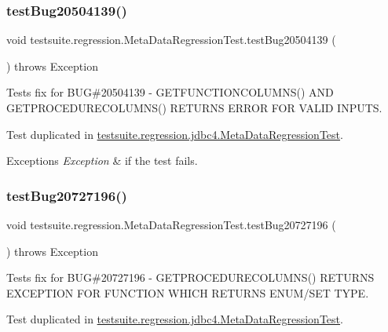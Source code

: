\subsubsection{\texorpdfstring{test\+Bug20504139()}{testBug20504139()}}
{\footnotesize\ttfamily void testsuite.\+regression.\+Meta\+Data\+Regression\+Test.\+test\+Bug20504139 (\begin{DoxyParamCaption}{ }\end{DoxyParamCaption}) throws Exception}

Tests fix for B\+UG\#20504139 -\/ G\+E\+T\+F\+U\+N\+C\+T\+I\+O\+N\+C\+O\+L\+U\+M\+N\+S() A\+ND G\+E\+T\+P\+R\+O\+C\+E\+D\+U\+R\+E\+C\+O\+L\+U\+M\+N\+S() R\+E\+T\+U\+R\+NS E\+R\+R\+OR F\+OR V\+A\+L\+ID I\+N\+P\+U\+TS.

Test duplicated in \mbox{\hyperlink{classtestsuite_1_1regression_1_1jdbc4_1_1_meta_data_regression_test}{testsuite.\+regression.\+jdbc4.\+Meta\+Data\+Regression\+Test}}.


\begin{DoxyExceptions}{Exceptions}
{\em Exception} & if the test fails. \\
\hline
\end{DoxyExceptions}
\mbox{\label{classtestsuite_1_1regression_1_1_meta_data_regression_test_a4c0d9aaa7ffb0619d60cd9801b2afcba}} 
\subsubsection{\texorpdfstring{test\+Bug20727196()}{testBug20727196()}}
{\footnotesize\ttfamily void testsuite.\+regression.\+Meta\+Data\+Regression\+Test.\+test\+Bug20727196 (\begin{DoxyParamCaption}{ }\end{DoxyParamCaption}) throws Exception}

Tests fix for B\+UG\#20727196 -\/ G\+E\+T\+P\+R\+O\+C\+E\+D\+U\+R\+E\+C\+O\+L\+U\+M\+N\+S() R\+E\+T\+U\+R\+NS E\+X\+C\+E\+P\+T\+I\+ON F\+OR F\+U\+N\+C\+T\+I\+ON W\+H\+I\+CH R\+E\+T\+U\+R\+NS E\+N\+U\+M/\+S\+ET T\+Y\+PE.

Test duplicated in \mbox{\hyperlink{classtestsuite_1_1regression_1_1jdbc4_1_1_meta_data_regression_test}{testsuite.\+regression.\+jdbc4.\+Meta\+Data\+Regression\+Test}}.



